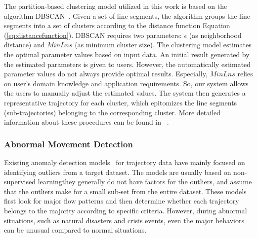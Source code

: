 The partition-based clustering model utilized in this work is based on the algorithm DBSCAN~\cite{Ester:1996:Density}.
Given a set of line segments, the algorithm groups the line segments into a set of clusters according to the distance function Equation (\ref{eq:distancefunction}).
DBSCAN requires two parameters: $\epsilon$ (as neighborhood distance) and $MinLns$ (as minimum cluster size).
The clustering model estimates the optimal parameter values based on input data.
An initial result generated by the estimated parameters is given to users.
However, the automatically estimated parameter values do not always provide optimal results.
Especially, $MinLns$ relies on user's domain knowledge and application requirements.
So, our system allows the users to manually adjust the estimated values.
The system then generates a representative trajectory for each cluster, which epitomizes the line segments (sub-trajectories) belonging to the corresponding cluster. More detailed information about these procedures can be found in ~\cite{Lee:2007:Trajectory}.


\subsubsection{Abnormal Movement Detection}
\label{sec:abnormal_movement_detection}
Existing anomaly detection models~\cite{Liao:2010:Anomaly,Lee:2008:Trajectory} for trajectory data have mainly focused on identifying outliers from a target dataset.
The models are usually based on non-supervised learning\textemdash they generally do not have factors for the outliers, and assume that the outliers make for a small sub-set from the entire dataset.
These models first look for major flow patterns and then determine whether each trajectory belongs to the majority according to specific criteria.
However, during abnormal situations, such as natural disasters and crisis events, even the major behaviors can be unusual compared to normal situations.

